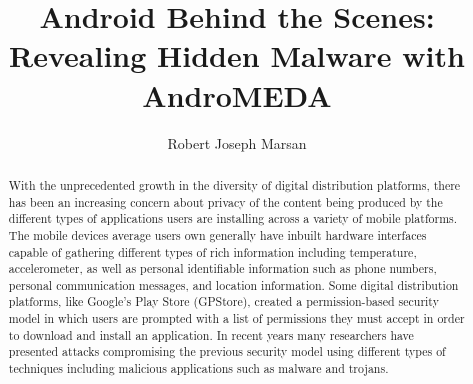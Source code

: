 \documentclass[edeposit,10pt,fullpage]{uiucthesis2009}
\begin{document}
\title{Android Behind the Scenes:\\ Revealing Hidden Malware with AndroMEDA}
\author{Robert Joseph Marsan}
\msthesis
{}
\maketitle

\frontmatter

\begin{abstract}

With the unprecedented growth in the diversity of digital distribution platforms, there has been an increasing concern about privacy of the content being produced by the different types of applications users are installing across a variety of mobile platforms.  The mobile devices average users own generally have inbuilt hardware interfaces capable of gathering different types of rich information including temperature, accelerometer, as well as personal identifiable information such as phone numbers, personal communication messages, and location information.  Some digital distribution platforms, like Google's Play Store (GPStore), created a permission-based security model in which users are prompted with a list of permissions they must accept in order to download and install an application. In recent years many researchers have presented attacks compromising the previous security model using different types of techniques including malicious applications such as malware and trojans. 


\end{abstract}
\end{document}
